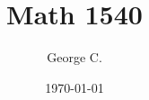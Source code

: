 \documentclass{article}
\title{Math 1540}
\author{George C.}
\date{\today}
\begin{document}

\maketitle
\tableofcontents
\listoftheorems

\newpage










% 
\end{document}
